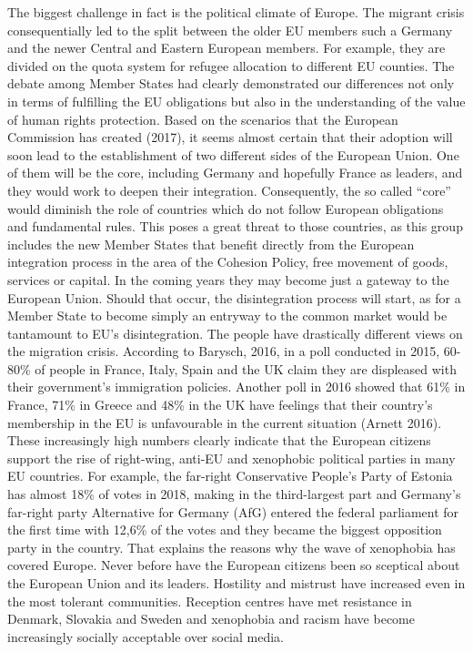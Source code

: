 \documentclass[]{article}
\begin{document}
The biggest challenge in fact is the political climate of Europe. The
migrant crisis consequentially led to the split between the older EU
members such a Germany and the newer Central and Eastern European
members. For example, they are divided on the quota system for refugee
allocation to different EU counties. The debate among Member States had
clearly demonstrated our differences not only in terms of fulfilling the
EU obligations but also in the understanding of the value of human
rights protection. Based on the scenarios that the European Commission
has created (2017), it seems almost certain that their adoption will
soon lead to the establishment of two different sides of the European
Union. One of them will be the core, including Germany and hopefully
France as leaders, and they would work to deepen their integration.
Consequently, the so called ``core'' would diminish the role of
countries which do not follow European obligations and fundamental
rules. This poses a great threat to those countries, as this group
includes the new Member States that benefit directly from the European
integration process in the area of the Cohesion Policy, free movement of
goods, services or capital. In the coming years they may become just a
gateway to the European Union. Should that occur, the disintegration
process will start, as for a Member State to become simply an entryway
to the common market would be tantamount to EU's disintegration. The
people have drastically different views on the migration crisis.
According to Barysch, 2016, in a poll conducted in 2015, 60-80\% of
people in France, Italy, Spain and the UK claim they are displeased with
their government's immigration policies. Another poll in 2016 showed
that 61\% in France, 71\% in Greece and 48\% in the UK have feelings
that their country's membership in the EU is unfavourable in the current
situation (Arnett 2016). These increasingly high numbers clearly
indicate that the European citizens support the rise of right-wing,
anti-EU and xenophobic political parties in many EU countries. For
example, the far-right Conservative People's Party of Estonia has almost
18\% of votes in 2018, making in the third-largest part and Germany's
far-right party Alternative for Germany (AfG) entered the federal
parliament for the first time with 12,6\% of the votes and they became
the biggest opposition party in the country. That explains the reasons
why the wave of xenophobia has covered Europe. Never before have the
European citizens been so sceptical about the European Union and its
leaders. Hostility and mistrust have increased even in the most tolerant
communities. Reception centres have met resistance in Denmark, Slovakia
and Sweden and xenophobia and racism have become increasingly socially
acceptable over social media.
\end{document}
